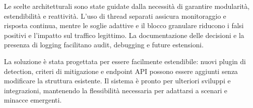 Le scelte architetturali sono state guidate dalla necessità di garantire modularità, estendibilità e reattività. L’uso di thread separati assicura monitoraggio e risposta continua, mentre le soglie adattive e il blocco granulare riducono i falsi positivi e l’impatto sul traffico legittimo. La documentazione delle decisioni e la presenza di logging facilitano audit, debugging e future estensioni.

La soluzione è stata progettata per essere facilmente estendibile: nuovi plugin di detection, criteri di mitigazione e endpoint API possono essere aggiunti senza modificare la struttura esistente. Il sistema è pronto per ulteriori sviluppi e integrazioni, mantenendo la flessibilità necessaria per adattarsi a scenari e minacce emergenti.
